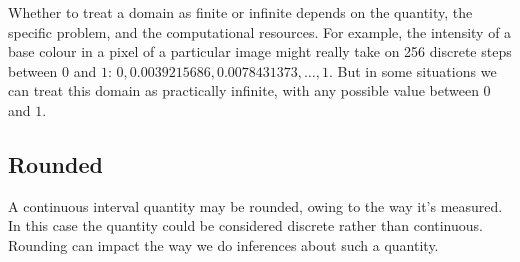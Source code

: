 \documentclass[
  a4paper,
  DIV=11,
  numbers=noendperiod,
  oneside]{scrreprt}
\begin{document}
Whether to treat a domain as finite or infinite depends on the quantity,
the specific problem, and the computational resources. For example, the
intensity of a base colour in a pixel of a particular image might really
take on 256 discrete steps between \(0\) and \(1\):
{\(0, 0.0039215686, 0.0078431373, \dotsc, 1\)}. But in some situations
we can treat this domain as practically infinite, with any possible
value between \(0\) and \(1\).

\hypertarget{rounded}{%
\subsection{Rounded}\label{rounded}}

A continuous interval quantity may be rounded, owing to the way it's
measured. In this case the quantity could be considered discrete rather
than continuous. Rounding can impact the way we do inferences about such
a quantity.

\end{document}

